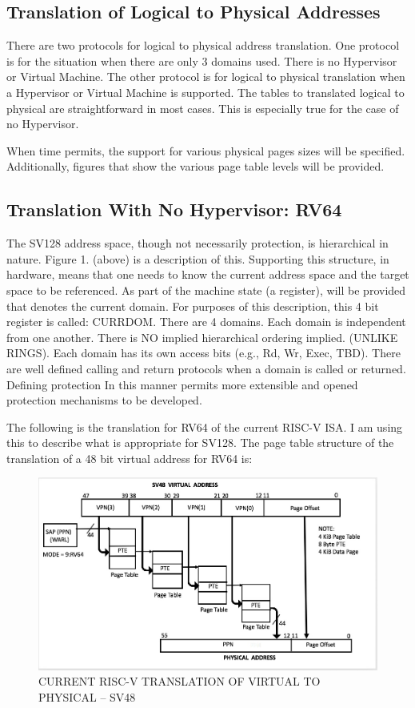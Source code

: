 \documentclass{article}
\begin{document}
\subsection{Translation of Logical to Physical Addresses}

There are two protocols for logical to  physical address translation.  One protocol is for the situation when there are only 3 domains used.  There is no Hypervisor or Virtual Machine.  The other protocol is for logical to  physical translation  when a Hypervisor or Virtual Machine is supported. The tables to translated logical to physical are straightforward in most cases.   This is especially true for the case of no Hypervisor.

When time permits,  the support for various   physical pages sizes will be specified.  Additionally, figures that show the various  page table levels will be provided.

\subsection{Translation With No Hypervisor: RV64}

The SV128 address space, though not necessarily protection, is hierarchical in nature. Figure 1.  (above) is a description of this.  Supporting this structure,  in hardware,  means that one needs to know the current address space and the  target space to be referenced. As part of the machine state (a register),  will be provided that denotes the current domain. For purposes of this description,  this 4 bit register is called: CURRDOM.   There are 4 domains.  Each domain is independent from one another.  There is NO implied hierarchical  ordering implied. (UNLIKE  RINGS).  Each domain has its own access bits (e.g., Rd, Wr, Exec, TBD). There are well defined calling and return protocols when a domain is called or returned.  Defining protection In this manner permits more extensible and opened protection mechanisms to be developed.  

The following is the  translation for RV64 of the current RISC-V ISA.  I am using this to describe what is appropriate for SV128.   The page table structure of the translation of a 48 bit virtual address for RV64 is:


\begin{figure}
\includegraphics[scale=.4]{figures/figure4_sv48_translation.jpg}
\caption{CURRENT RISC-V TRANSLATION OF VIRTUAL TO PHYSICAL – SV48}
\end{figure}
\end{document}
